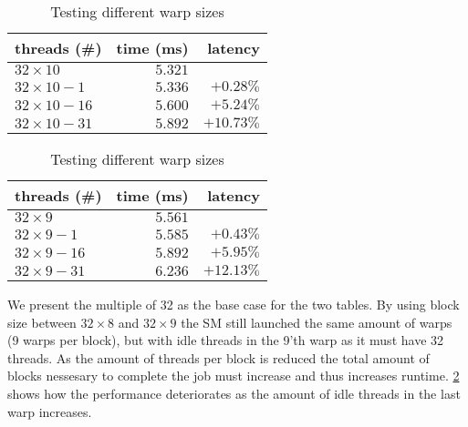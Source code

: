 \begin{table}[htb]%
  \begin{minipage}{0.49\linewidth}
    \centering
    \begin{tabular}{lrr}
      \toprule
      threads (\#) & time (ms) & latency \\
      \midrule
      $32 \times 10$    & $5.321$ &          \\
      $32 \times 10-1$  & $5.336$ & $+0.28\%$  \\
      $32 \times 10-16$ & $5.600$ & $+5.24\%$  \\
      $32 \times 10-31$ & $5.892$ & $+10.73\%$ \\
      \bottomrule
    \end{tabular}
  \end{minipage}%
  \begin{minipage}{0.49\linewidth}
    \centering
    \begin{tabular}{lrr}
      \toprule
      threads (\#) & time (ms) & latency \\
      \midrule
      $32 \times 9$     & $5.561$ & \\
      $32 \times 9-1$   & $5.585$ & $+0.43\%$  \\
      $32 \times 9-16$  & $5.892$ & $+5.95\%$  \\
      $32 \times 9-31$  & $6.236$ & $+12.13\%$ \\
      \bottomrule
    \end{tabular}
  \end{minipage}%
  \caption{Testing different warp sizes}
  \label{tab:warp size testing}
\end{table}

We present the multiple of 32 as the base case for the two tables.
By using block size between $32 \times 8$ and $32 \times 9$ the SM still launched the same amount of warps (9 warps per block), but with idle threads in the 9'th warp as it must have 32 threads.
As the amount of threads per block is reduced the total amount of blocks nessesary to complete the job must increase and thus increases runtime.
\cref{tab:warp size testing} shows how the performance deteriorates as the amount of idle threads in the last warp increases.
